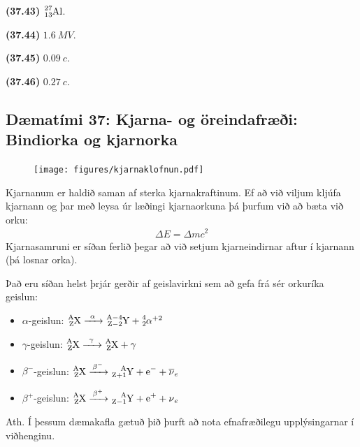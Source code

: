 \begin{tcolorbox}
\begin{enumerate*}[label = ]
  \item \textbf{(37.43)} $\ce{^{27}_{13}Al}$.
  \item \textbf{(37.44)} $\SI{1.6}{MV}$.
  \item \textbf{(37.45)} $\SI{0.09}{}c$.
  \item \textbf{(37.46)} $\SI{0.27}{}c$.
\end{enumerate*}
\end{tcolorbox}

\newpage

\subsection*{Dæmatími 37: Kjarna- og öreindafræði: Bindiorka og kjarnorka}

\begin{tcolorbox}
\begin{minipage}{\linewidth}
\begin{figure}
\vspace{-0.5cm}
\texttt{[image: figures/kjarnaklofnun.pdf]}
\end{figure}

Kjarnanum er haldið saman af sterka kjarnakraftinum. Ef að við viljum kljúfa kjarnann og þar með leysa úr læðingi kjarnaorkuna þá þurfum við að bæta við orku:
\begin{align*}
    \Delta E = \Delta m c^2
\end{align*}
Kjarnasamruni er síðan ferlið þegar að við setjum kjarneindirnar aftur í kjarnann (þá losnar orka). \\
\end{minipage}
Það eru síðan helst þrjár gerðir af geislavirkni sem að gefa frá sér orkuríka geislun:
\begin{multicols}{2}
\begin{itemize}
    \item $\alpha$-geislun: $\ce{^{A}_{Z}X ->[\alpha] ^{A-4}_{Z-2}Y + ^{4}_{2}\alpha}^{+2}$
    \item $\gamma$-geislun: $\ce{^{A}_{Z}X ->[\gamma] ^{A}_{Z}X + \gamma}$
    \item $\beta^{-}$-geislun: $\ce{^{A}_{Z}X ->[\beta^-] ^{A}_{Z+1}Y + e^{-} + \overline{\nu}_e}$
    \item $\beta^{+}$-geislun: $\ce{^{A}_{Z}X ->[\beta^+] ^{A}_{Z-1}Y + e^{+} + \nu_e}$
\end{itemize}
\end{multicols}
Ath. Í þessum dæmakafla gætuð þið þurft að nota efnafræðilegu upplýsingarnar í viðhenginu.
\end{tcolorbox}

